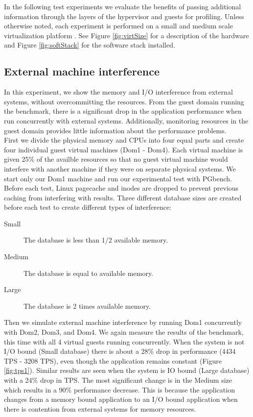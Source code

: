 In the following test experiments we evaluate the benefits of passing additional information through the layers of the hypervisor and guests for profiling.  Unless otherwise noted, each experiment is performed on a small and medium scale virtualization platform . See Figure \ref{fig:virtSize} for a description of the hardware and Figure \ref{fig:softStack} for the software stack installed.

\subsection{External machine interference}
In this experiment, we show the memory and I/O interference from external systems, without overcommitting the resources.  From the guest domain running the benchmark, there is a significant drop in the application performance when run concurrently with external systems.  Additionally, monitoring resources in the guest domain provides little information about the performance problems. \\

First we divide the physical memory and CPUs into four equal parts and create four individual guest virtual machines (Dom1 - Dom4).  Each virtual machine is given 25\% of the availble resources so that no guest virtual machine would interfere with another machine if they were on separate physical systems.  We start only our Dom1 machine and run our experimental test with PGbench.  Before each test, Linux pagecache and inodes are dropped to prevent previous caching from interfering with results.  Three different database sizes are created before each test to create different types of interference:

\begin{description}
  \item[Small] The database is less than 1/2 available memory.
  \item[Medium] The database is equal to available memory.
  \item[Large] The database is 2 times available memory.
\end{description}

Then we simulate external machine interference by running Dom1 concurrently with Dom2, Dom3, and Dom4.  We again measure the results of the benchmark, this time with all 4 virtual guests running concurrently.  When the system is not I/O bound (Small database) there is about a 28\% drop in performance (4434 TPS - 3208 TPS), even though the application remains constant (Figure \ref{fig:tps1}).
Similar results are seen when the system is IO bound (Large database) with a 24\% drop in TPS.  The most significant change is in the Medium size which results in a 90\% performance decrease.  This is because the application changes from a memory bound application to an I/O bound application when there is contention from external systems for memory resources.  

